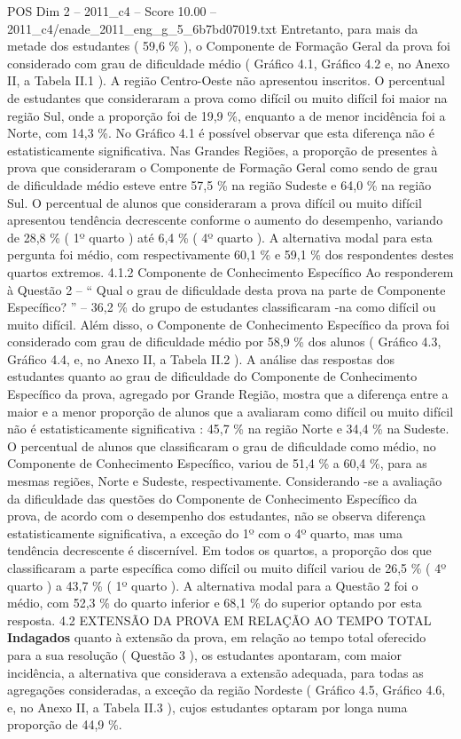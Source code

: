 \begin{textsample}{POS Dim 2 – 2011\_c4 – Score 10.00 – 2011\_c4/enade\_2011\_eng\_g\_5\_6b7bd07019.txt}
Entretanto, para mais da metade dos estudantes ( 59,6 \% ), o Componente de Formação Geral da prova foi considerado com grau de dificuldade médio ( Gráfico 4.1, Gráfico 4.2 e, no Anexo II, a Tabela II.1 ).
A região Centro-Oeste não apresentou inscritos.
O percentual de estudantes que consideraram a prova como difícil ou muito difícil foi maior na região Sul, onde a proporção foi de 19,9 \%, enquanto a de menor incidência foi a Norte, com 14,3 \%.
No Gráfico 4.1 é possível observar que esta diferença não é estatisticamente significativa.
Nas Grandes Regiões, a proporção de presentes à prova que consideraram o Componente de Formação Geral como sendo de grau de dificuldade médio esteve entre 57,5 \% na região Sudeste e 64,0 \% na região Sul.
O percentual de alunos que consideraram a prova difícil ou muito difícil apresentou tendência decrescente conforme o aumento do desempenho, variando de 28,8 \% ( 1º quarto ) até 6,4 \% ( 4º quarto ).
A alternativa modal para esta pergunta foi médio, com respectivamente 60,1 \% e 59,1 \% dos respondentes destes quartos extremos. 4.1.2 Componente de Conhecimento Específico Ao responderem à Questão 2 – “ Qual o grau de dificuldade desta prova na parte de Componente Específico? ” – 36,2 \% do grupo de estudantes classificaram -na como difícil ou muito difícil.
Além disso, o Componente de Conhecimento Específico da prova foi considerado com grau de dificuldade médio por 58,9 \% dos alunos ( Gráfico 4.3, Gráfico 4.4, e, no Anexo II, a Tabela II.2 ).
A análise das respostas dos estudantes quanto ao grau de dificuldade do Componente de Conhecimento Específico da prova, agregado por Grande Região, mostra que a diferença entre a maior e a menor proporção de alunos que a avaliaram como difícil ou muito difícil não é estatisticamente significativa : 45,7 \% na região Norte e 34,4 \% na Sudeste.
O percentual de alunos que classificaram o grau de dificuldade como médio, no Componente de Conhecimento Específico, variou de 51,4 \% a 60,4 \%, para as mesmas regiões, Norte e Sudeste, respectivamente.
Considerando -se a avaliação da dificuldade das questões do Componente de Conhecimento Específico da prova, de acordo com o desempenho dos estudantes, não se observa diferença estatisticamente significativa, a exceção do 1º com o 4º quarto, mas uma tendência decrescente é discernível.
Em todos os quartos, a proporção dos que classificaram a parte específica como difícil ou muito difícil variou de 26,5 \% ( 4º quarto ) a 43,7 \% ( 1º quarto ).
A alternativa modal para a Questão 2 foi o médio, com 52,3 \% do quarto inferior e 68,1 \% do superior optando por esta resposta. 4.2 EXTENSÃO DA PROVA EM RELAÇÃO AO TEMPO TOTAL \textbf{Indagados} quanto à extensão da prova, em relação ao tempo total oferecido para a sua resolução ( Questão 3 ), os estudantes apontaram, com maior incidência, a alternativa que considerava a extensão adequada, para todas as agregações consideradas, a exceção da região Nordeste ( Gráfico 4.5, Gráfico 4.6, e, no Anexo II, a Tabela II.3 ), cujos estudantes optaram por longa numa proporção de 44,9 \%.

\end{textsample}

